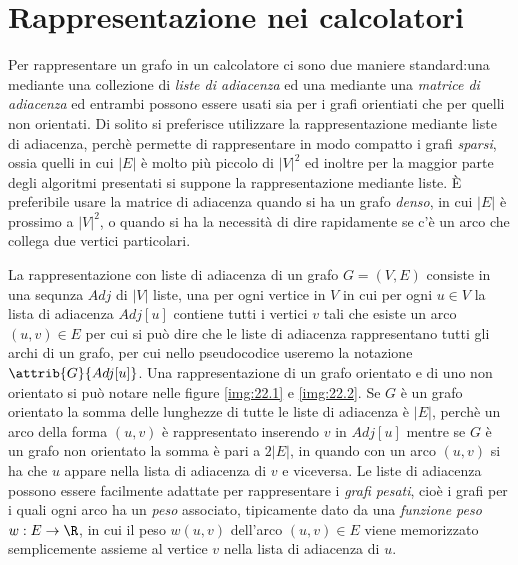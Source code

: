 \section{Rappresentazione nei calcolatori}
Per rappresentare un grafo in un calcolatore ci sono due maniere standard:una mediante una collezione di \emph{liste di adiacenza} ed una mediante una \emph{matrice di adiacenza}
ed entrambi possono essere usati sia per i grafi orientiati che per quelli non orientati.\newline
Di solito si preferisce utilizzare la rappresentazione mediante liste di adiacenza, perchè permette di rappresentare in modo compatto i grafi \emph{sparsi}, ossia quelli in cui 
$|E|$ è molto più piccolo di $|V|^2$ ed inoltre per la maggior parte degli algoritmi presentati si suppone la rappresentazione mediante liste.\newline
È preferibile usare la matrice di adiacenza quando si ha un grafo \emph{denso}, in cui $|E|$ è prossimo a $|V|^2$, o quando si ha la necessità di dire rapidamente se 
c'è un arco che collega due vertici particolari.

La rappresentazione con liste di adiacenza di un grafo $G = (V, E)$ consiste in una sequnza $Adj$ di $|V|$ liste, una per ogni vertice in $V$ in cui per ogni $u \in V$
la lista di adiacenza $Adj[u]$ contiene tutti i vertici $v$ tali che esiste un arco $(u, v) \in E$ per cui si può dire che le liste di adiacenza rappresentano
tutti gli archi di un grafo, per cui nello pseudocodice useremo la notazione $\attrib{G}{Adj[u]}$.\newline
Una rappresentazione di un grafo orientato e di uno non orientato si può notare nelle figure \ref{img:22.1} e \ref{img:22.2}.\newline
Se $G$ è un grafo orientato la somma delle lunghezze di tutte le liste di adiacenza è $|E|$, perchè un arco della forma $(u, v)$ è rappresentato inserendo $v$ in $Adj[u]$
mentre se $G$ è un grafo non orientato la somma è pari a $2|E|$, in quando con un arco $(u, v)$ si ha che $u$ appare nella lista di adiacenza di $v$ e viceversa.\newline
Le liste di adiacenza possono essere facilmente adattate per rappresentare i \emph{grafi pesati}, cioè i grafi per i quali ogni arco ha un \emph{peso} associato, 
tipicamente dato da una \emph{funzione peso} $w:E \to \R$, in cui il peso $w(u, v)$ dell'arco $(u, v) \in E$ viene memorizzato semplicemente assieme al vertice $v$
nella lista di adiacenza di $u$.

